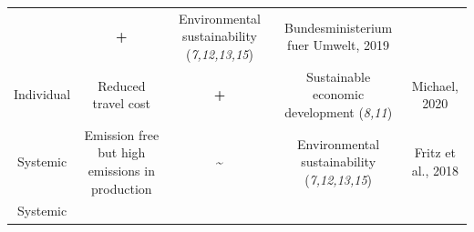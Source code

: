 \documentclass[
]{book}
\begin{document}
\begin{longtable}[]{@{}ccccc@{}}
\begin{minipage}[t]{0.16\columnwidth}
\end{minipage} & \begin{minipage}[t]{0.17\columnwidth}\centering
\textbf{+}\strut
\end{minipage} & \begin{minipage}[t]{0.17\columnwidth}\centering
Environmental sustainability (\emph{7,12,13,15})\strut
\end{minipage} & \begin{minipage}[t]{0.17\columnwidth}\centering
Bundesministerium fuer Umwelt, 2019\strut
\end{minipage}\tabularnewline
\begin{minipage}[t]{0.17\columnwidth}\centering
Individual\strut
\end{minipage} & \begin{minipage}[t]{0.16\columnwidth}\centering
Reduced travel cost\strut
\end{minipage} & \begin{minipage}[t]{0.17\columnwidth}\centering
\textbf{+}\strut
\end{minipage} & \begin{minipage}[t]{0.17\columnwidth}\centering
Sustainable economic development (\emph{8,11})\strut
\end{minipage} & \begin{minipage}[t]{0.17\columnwidth}\centering
Michael, 2020\strut
\end{minipage}\tabularnewline
\begin{minipage}[t]{0.17\columnwidth}\centering
Systemic\strut
\end{minipage} & \begin{minipage}[t]{0.16\columnwidth}\centering
Emission free but high emissions in production\strut
\end{minipage} & \begin{minipage}[t]{0.17\columnwidth}\centering
\textbf{\textasciitilde{}}\strut
\end{minipage} & \begin{minipage}[t]{0.17\columnwidth}\centering
Environmental sustainability (\emph{7,12,13,15})\strut
\end{minipage} & \begin{minipage}[t]{0.17\columnwidth}\centering
Fritz et al., 2018\strut
\end{minipage}\tabularnewline
\begin{minipage}[t]{0.17\columnwidth}\centering
Systemic\strut
\end{minipage} & \begin{minipage}[t]{0.16\columnwidth}\centering

\end{minipage}
\end{longtable}
\end{document}
